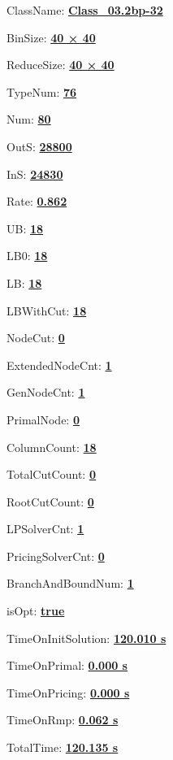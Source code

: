 \documentclass[11pt]{article}
\begin{document}
\pagestyle{empty}


ClassName: \underline{\textbf{Class_03.2bp-32}}
\par
BinSize: \underline{\textbf{40 × 40}}
\par
ReduceSize: \underline{\textbf{40 × 40}}
\par
TypeNum: \underline{\textbf{76}}
\par
Num: \underline{\textbf{80}}
\par
OutS: \underline{\textbf{28800}}
\par
InS: \underline{\textbf{24830}}
\par
Rate: \underline{\textbf{0.862}}
\par
UB: \underline{\textbf{18}}
\par
LB0: \underline{\textbf{18}}
\par
LB: \underline{\textbf{18}}
\par
LBWithCut: \underline{\textbf{18}}
\par
NodeCut: \underline{\textbf{0}}
\par
ExtendedNodeCnt: \underline{\textbf{1}}
\par
GenNodeCnt: \underline{\textbf{1}}
\par
PrimalNode: \underline{\textbf{0}}
\par
ColumnCount: \underline{\textbf{18}}
\par
TotalCutCount: \underline{\textbf{0}}
\par
RootCutCount: \underline{\textbf{0}}
\par
LPSolverCnt: \underline{\textbf{1}}
\par
PricingSolverCnt: \underline{\textbf{0}}
\par
BranchAndBoundNum: \underline{\textbf{1}}
\par
isOpt: \underline{\textbf{true}}
\par
TimeOnInitSolution: \underline{\textbf{120.010 s}}
\par
TimeOnPrimal: \underline{\textbf{0.000 s}}
\par
TimeOnPricing: \underline{\textbf{0.000 s}}
\par
TimeOnRmp: \underline{\textbf{0.062 s}}
\par
TotalTime: \underline{\textbf{120.135 s}}
\par
\newpage


\end{document}
